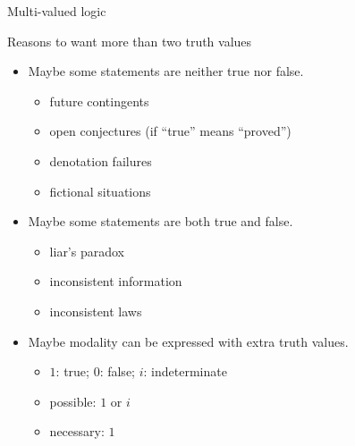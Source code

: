 \documentclass{beamer}
\newcommand{\sect}[1]{\begin{frame}\centerline{\large #1}\end{frame}}
\begin{document}
\sect{Multi-valued logic}

\begin{frame}{Reasons to want more than two truth values}
\begin{itemize}
\item Maybe some statements are neither true nor false.
    \begin{itemize}
    \item future contingents
    \item open conjectures (if ``true'' means ``proved'')
    \item denotation failures
    \item fictional situations
    \end{itemize}
\item Maybe some statements are both true and false.
    \begin{itemize}
    \item liar's paradox
    \item inconsistent information
    \item inconsistent laws
    \end{itemize}
\item Maybe modality can be expressed with extra truth values.
    \begin{itemize}
    \item $1$: true; $0$: false; $i$: indeterminate
    \item possible: $1$ or $i$
    \item necessary: $1$
    \end{itemize}
\end{itemize}
\end{frame}
\end{document}
